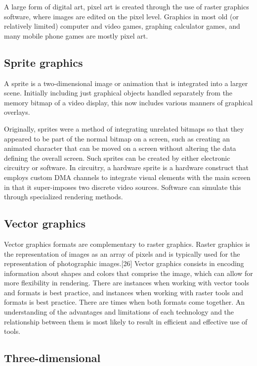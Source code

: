 \documentclass[a4paper]{article}
\begin{document}
 A large form of digital art, pixel art is created through the use of raster graphics software, where images are edited on the pixel level. Graphics in most old (or relatively limited) computer and video games, graphing calculator games, and many mobile phone games are mostly pixel art.
 \subsection{Sprite graphics}
 
 A sprite is a two-dimensional image or animation that is integrated into a larger scene. Initially including just graphical objects handled separately from the memory bitmap of a video display, this now includes various manners of graphical overlays.

Originally, sprites were a method of integrating unrelated bitmaps so that they appeared to be part of the normal bitmap on a screen, such as creating an animated character that can be moved on a screen without altering the data defining the overall screen. Such sprites can be created by either electronic circuitry or software. In circuitry, a hardware sprite is a hardware construct that employs custom DMA channels to integrate visual elements with the main screen in that it super-imposes two discrete video sources. Software can simulate this through specialized rendering methods.

  \newpage
  
  \subsection{Vector graphics}
 Vector graphics formats are complementary to raster graphics. Raster graphics is the representation of images as an array of pixels and is typically used for the representation of photographic images.[26] Vector graphics consists in encoding information about shapes and colors that comprise the image, which can allow for more flexibility in rendering. There are instances when working with vector tools and formats is best practice, and instances when working with raster tools and formats is best practice. There are times when both formats come together. An understanding of the advantages and limitations of each technology and the relationship between them is most likely to result in efficient and effective use of tools.


\subsection{Three-dimensional}
 
\end{document}
